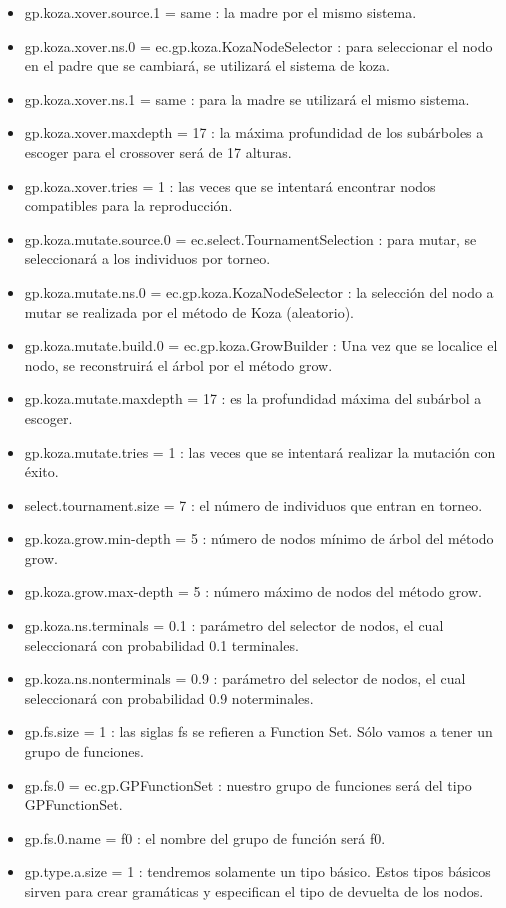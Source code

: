 \begin{itemize}
\item	gp.koza.xover.source.1 = same : la madre por el mismo sistema.
\item	gp.koza.xover.ns.0 = ec.gp.koza.KozaNodeSelector : para seleccionar el nodo en el padre que se cambiará, se utilizará el sistema de koza.
\item	gp.koza.xover.ns.1 = same : para la madre se utilizará el mismo sistema.
\item	gp.koza.xover.maxdepth = 17 : la máxima profundidad de los subárboles a escoger para el crossover será de 17 alturas.
\item	gp.koza.xover.tries = 1 : las veces que se intentará encontrar nodos compatibles para la reproducción.
\item	gp.koza.mutate.source.0 = ec.select.TournamentSelection : para mutar, se seleccionará a los individuos por torneo.
\item	gp.koza.mutate.ns.0 = ec.gp.koza.KozaNodeSelector : la selección del nodo a mutar se realizada por el método de Koza (aleatorio).
\item	gp.koza.mutate.build.0 = ec.gp.koza.GrowBuilder : Una vez que se localice el nodo, se reconstruirá el árbol por el método grow.
\item	gp.koza.mutate.maxdepth = 17 : es la profundidad máxima del subárbol a escoger. 
\item	gp.koza.mutate.tries = 1 : las veces que se intentará realizar la mutación con éxito.
\item	select.tournament.size = 7 : el número de individuos que entran en torneo.
\item	gp.koza.grow.min-depth = 5 : número de nodos mínimo de árbol del método grow.
\item	gp.koza.grow.max-depth = 5 : número máximo de nodos del método grow.
\item	gp.koza.ns.terminals = 0.1 : parámetro del selector de nodos, el cual seleccionará con probabilidad 0.1 terminales.
\item	gp.koza.ns.nonterminals = 0.9 : parámetro del selector de nodos, el cual seleccionará con probabilidad 0.9 noterminales.
\item	gp.fs.size = 1 : las siglas fs se refieren a Function Set. Sólo vamos a tener un grupo de funciones.
\item	gp.fs.0 = ec.gp.GPFunctionSet : nuestro grupo de funciones será del tipo GPFunctionSet.
\item	gp.fs.0.name = f0 : el nombre del grupo de función será f0.
\item	gp.type.a.size = 1 : tendremos solamente un tipo básico. Estos tipos básicos sirven para crear gramáticas y especifican el tipo de devuelta de los nodos.

\end{itemize}
